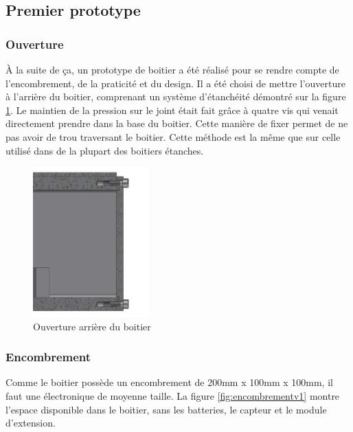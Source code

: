 \subsection{Premier prototype}

\subsubsection{Ouverture}

À la suite de ça, un prototype de boitier a été réalisé pour se rendre compte de l’encombrement, de la 
praticité et du design. Il a été choisi de mettre l'ouverture à l’arrière du boitier, comprenant un
système d’étanchéité démontré sur la figure \ref{fig:vuearriereboitier}. Le maintien de la pression 
sur le joint était fait grâce à quatre vis qui venait directement prendre dans la base du boitier. 
Cette manière de fixer permet de ne pas avoir de trou traversant le boitier. Cette méthode est la 
même que sur celle utilisé dans de la plupart des boitiers étanches.

\begin{figure}[H]
    \centering
    \includegraphics[width=0.4\textwidth]{Images/photos_PGA/Arrièreboitierv3coté.PNG}
    \caption{Ouverture arrière du boitier}
    \label{fig:vuearriereboitier}
\end{figure}

\subsubsection{Encombrement}

Comme le boitier possède un encombrement de 200mm x 100mm x 100mm, il faut une électronique de 
moyenne taille. La figure \ref{fig:encombrementv1} montre l'espace disponible dans le boitier, sans 
les batteries, le capteur et le module d'extension.

